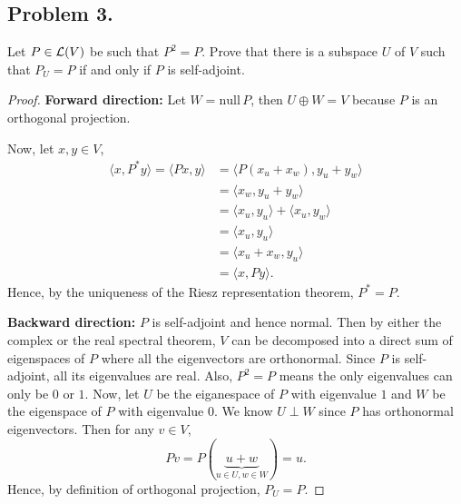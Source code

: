 \documentclass{article}
\newcommand*{\nul}{\ensuremath{\mathrm{null}}\,}
\begin{document}
\newpage
\subsection*{Problem 3.}
Let $P\in {\cal L}(V)$  be such that $P^2=P$. Prove that there is a subspace $U$ of $V$ such that $P_U=P$ if and only if $P$ is self-adjoint.
\begin{proof}
    \textbf{Forward direction:} Let $W = \nul P$, then $U\oplus W = V$ because $P$ is an orthogonal 
    projection.

    Now, let $x, y\in V$, 
    \begin{align*}
        \langle x, P^*y\rangle = \langle Px, y\rangle & = \langle P(x_u + x_w), y_u + y_w \rangle \\
        & = \langle x_w, y_u+y_w\rangle \\
        & = \langle x_u, y_u \rangle + \langle x_u, y_w \rangle \\
        & = \langle x_u, y_u \rangle \\
        & = \langle x_u + x_w, y_u \rangle \\
        & = \langle x, Py\rangle.
    \end{align*}
    Hence, by the uniqueness of the Riesz representation theorem, $P^* = P$.

    \textbf{Backward direction:} $P$ is self-adjoint and hence normal. Then by either the complex 
    or the real spectral theorem, $V$ can be decomposed into a direct sum of eigenspaces of $P$ 
    where all the eigenvectors are orthonormal. Since $P$ is self-adjoint, all its eigenvalues are 
    real. Also, $P^2 = P$ means the only eigenvalues can only be $0$ or $1$. Now, let $U$ be the 
    eiganespace of $P$ with eigenvalue $1$ and $W$ be the eigenspace of $P$ with eigenvalue $0$. 
    We know $U\perp W$ since $P$ has orthonormal eigenvectors.
    Then for any $v\in V$, 
    $$Pv = P(\underbrace{u + w}_{u\in U, w\in W}) = u.$$ Hence, by definition of orthogonal
    projection, $P_U = P$.
\end{proof}

\newpage
\end{document}
